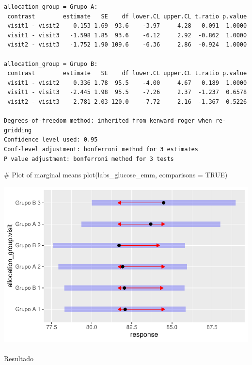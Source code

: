 \documentclass[
  12pt,
]{article}
\makeatletter
\let\oldparagraph\paragraph
\renewcommand{\paragraph}{
    \@ifstar
      \xxxParagraphStar
      \xxxParagraphNoStar
  }
\newcommand{\xxxParagraphStar}[1]{\oldparagraph*{#1}\mbox{}}
\newcommand{\xxxParagraphNoStar}[1]{\oldparagraph{#1}\mbox{}}
\newenvironment{Shaded}{\begin{snugshade}}{\end{snugshade}}
\newcommand{\AttributeTok}[1]{\textcolor[rgb]{0.40,0.45,0.13}{#1}}
\newcommand{\CommentTok}[1]{\textcolor[rgb]{0.37,0.37,0.37}{#1}}
\newcommand{\ConstantTok}[1]{\textcolor[rgb]{0.56,0.35,0.01}{#1}}
\newcommand{\FunctionTok}[1]{\textcolor[rgb]{0.28,0.35,0.67}{#1}}
\newcommand{\NormalTok}[1]{\textcolor[rgb]{0.00,0.23,0.31}{#1}}
\makeatother
\begin{document}
\begin{verbatim}
allocation_group = Grupo A:
 contrast        estimate   SE    df lower.CL upper.CL t.ratio p.value
 visit1 - visit2    0.153 1.69  93.6    -3.97     4.28   0.091  1.0000
 visit1 - visit3   -1.598 1.85  93.6    -6.12     2.92  -0.862  1.0000
 visit2 - visit3   -1.752 1.90 109.6    -6.36     2.86  -0.924  1.0000

allocation_group = Grupo B:
 contrast        estimate   SE    df lower.CL upper.CL t.ratio p.value
 visit1 - visit2    0.336 1.78  95.5    -4.00     4.67   0.189  1.0000
 visit1 - visit3   -2.445 1.98  95.5    -7.26     2.37  -1.237  0.6578
 visit2 - visit3   -2.781 2.03 120.0    -7.72     2.16  -1.367  0.5226

Degrees-of-freedom method: inherited from kenward-roger when re-gridding 
Confidence level used: 0.95 
Conf-level adjustment: bonferroni method for 3 estimates 
P value adjustment: bonferroni method for 3 tests 
\end{verbatim}

\begin{Shaded}
\begin{Highlighting}[]
\CommentTok{\# Plot of marginal means}
\FunctionTok{plot}\NormalTok{(labs\_glucose\_emm, }\AttributeTok{comparisons =} \ConstantTok{TRUE}\NormalTok{)}
\end{Highlighting}
\end{Shaded}

\includegraphics{Outcomes_files/figure-pdf/labs_glucose_sens_emm-1.pdf}

\paragraph{Resultado}\label{resultado-8}
\end{document}
